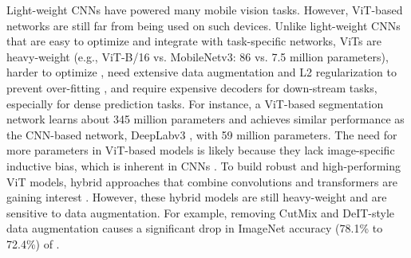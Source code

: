 \documentclass[preprint]{article} \usepackage{iclr2022_conference,times}
\begin{document}
Light-weight CNNs have powered many mobile vision tasks. However, ViT-based networks are still far from being used on such devices. Unlike light-weight CNNs that are easy to optimize and integrate with task-specific networks, ViTs are heavy-weight (e.g., ViT-B/16 vs. MobileNetv3: 86 vs. 7.5 million parameters), harder to optimize \citep{xiao2021early}, need extensive data augmentation and L2 regularization to prevent over-fitting \citep{touvron2021training, wang2021pyramid}, and require expensive decoders for down-stream tasks, especially for dense prediction tasks. For instance, a ViT-based segmentation network \citep{ranftl2021vision} learns about 345 million parameters and achieves similar performance as the  CNN-based network, DeepLabv3 \citep{chen2017rethinking}, with 59 million parameters. The need for more parameters in ViT-based models is likely because they lack image-specific inductive bias, which is inherent in CNNs \citep{xiao2021early}. To build robust and high-performing ViT models, hybrid approaches that combine convolutions and transformers are gaining interest \citep{xiao2021early, d2021convit, chen2021mobile}. However, these hybrid models are still heavy-weight and are sensitive to data augmentation. For example, removing CutMix \citep{zhong2020random} and DeIT-style \citep{touvron2021training} data augmentation causes a significant drop in ImageNet accuracy (78.1\% to 72.4\%) of  \citet{heo2021rethinking}.
\end{document}
